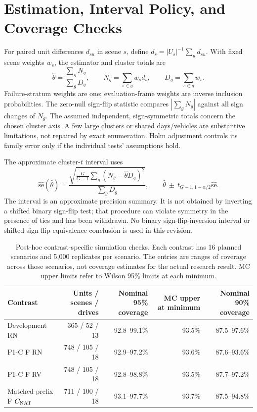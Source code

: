 \section{Estimation, Interval Policy, and Coverage Checks}
\label{app:stats}
For paired unit differences $d_{su}$ in scene $s$, define $d_s=|U_s|^{-1}\sum_u d_{su}$. With fixed scene weights $w_s$, the estimator and cluster totals are
\begin{equation}
\widehat\theta=\frac{\sum_g N_g}{\sum_g D_g},\qquad
N_g=\sum_{s\in g}w_s d_s,\qquad D_g=\sum_{s\in g}w_s.
\end{equation}
Failure-stratum weights are one; evaluation-frame weights are inverse inclusion probabilities. The zero-null sign-flip statistic compares $|\sum_gN_g|$ against all sign changes of $N_g$. The assumed independent, sign-symmetric totals concern the chosen cluster axis. A few large clusters or shared days/vehicles are substantive limitations, not repaired by exact enumeration. Holm adjustment controls its family error only if the individual tests' assumptions hold.

The approximate cluster-$t$ interval uses
\begin{equation}
\widehat{\mathrm{se}}(\widehat\theta)=
\frac{\sqrt{\frac{G}{G-1}\sum_g(N_g-\widehat\theta D_g)^2}}{\sum_gD_g},
\qquad \widehat\theta\ \pm\ t_{G-1,1-\alpha/2}\widehat{\mathrm{se}}.
\end{equation}
The interval is an approximate precision summary. It is not obtained by inverting a shifted binary sign-flip test; that procedure can violate symmetry in the presence of ties and has been withdrawn. No binary sign-flip-inversion interval or shifted sign-flip equivalence conclusion is used in this revision.

\begin{table}[ht]
\centering\small
\caption{Post-hoc contrast-specific simulation checks. Each contrast has 16 planned scenarios and 5,000 replicates per scenario. The entries are ranges of coverage across those scenarios, not coverage estimates for the actual research result. MC upper limits refer to Wilson 95\% limits at each minimum.}
\label{tab:coverage}
\begin{tabular}{@{}lrrrr@{}}\toprule
Contrast & Units / scenes / drives & Nominal 95\% coverage & MC upper at minimum & Nominal 90\% coverage\\\midrule
Development RN & 365 / 52 / 13 & 92.8--99.1\% & 93.5\% & 87.5--97.6\%\\
P1-C F RN & 748 / 105 / 18 & 92.9--97.2\% & 93.6\% & 87.6--93.6\%\\
P1-C F RV & 748 / 105 / 18 & 92.8--98.8\% & 93.5\% & 87.7--97.2\%\\
Matched-prefix F $C_{\mathrm{NAT}}$ & 711 / 100 / 18 & 93.1--97.7\% & 93.7\% & 87.5--94.8\%\\\bottomrule
\end{tabular}
\end{table}

